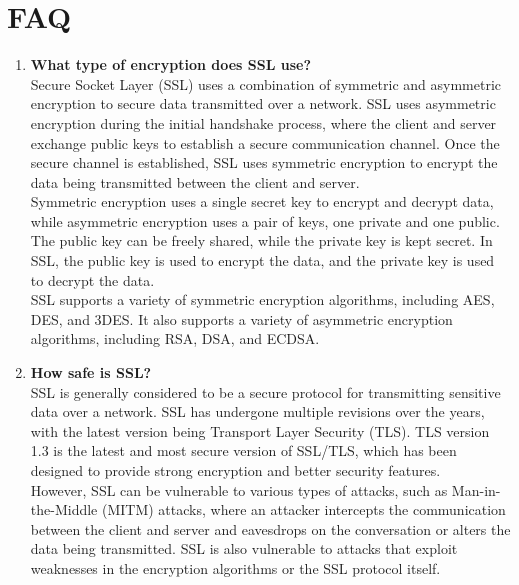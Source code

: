 \documentclass[11pt]{article}
\begin{document}
\section{FAQ}

\begin{enumerate}
    \item \textbf{What type of encryption does SSL use?}\\

          Secure Socket Layer (SSL) uses a combination of symmetric and asymmetric encryption to secure data transmitted over a network. SSL uses asymmetric encryption during the initial handshake process, where the client and server exchange public keys to establish a secure communication channel. Once the secure channel is established, SSL uses symmetric encryption to encrypt the data being transmitted between the client and server.\\

          Symmetric encryption uses a single secret key to encrypt and decrypt data, while asymmetric encryption uses a pair of keys, one private and one public. The public key can be freely shared, while the private key is kept secret. In SSL, the public key is used to encrypt the data, and the private key is used to decrypt the data.\\

          SSL supports a variety of symmetric encryption algorithms, including AES, DES, and 3DES. It also supports a variety of asymmetric encryption algorithms, including RSA, DSA, and ECDSA.

    \item \textbf{How safe is SSL?}\\

          SSL is generally considered to be a secure protocol for transmitting sensitive data over a network. SSL has undergone multiple revisions over the years, with the latest version being Transport Layer Security (TLS). TLS version 1.3 is the latest and most secure version of SSL/TLS, which has been designed to provide strong encryption and better security features.\\

          However, SSL can be vulnerable to various types of attacks, such as Man-in-the-Middle (MITM) attacks, where an attacker intercepts the communication between the client and server and eavesdrops on the conversation or alters the data being transmitted. SSL is also vulnerable to attacks that exploit weaknesses in the encryption algorithms or the SSL protocol itself.\\


\end{enumerate}
\end{document}
